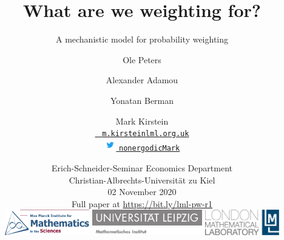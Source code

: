 \title[\insertlogo\\
\vspace{.5em}
\lmlblue{Mark Kirstein}]{\textbf{
What are we weighting for?
}}
\subtitle{A mechanistic model for probability weighting}


\author[M Kirstein]{
Ole Peters \and Alexander Adamou \and Yonatan Berman \and Mark Kirstein\\
\vspace{.5em}
{\small
\href{mailto:m.kirstein@lml.org.uk}{\Letter ~ \texttt{m.kirstein{\MVAt}lml.org.uk}} \\
\href{https://twitter.com/nonergodicMark}{\includegraphics[height=1.4em,valign=c]{img/Twitter_Logo_Blue} \MVAt \texttt{nonergodicMark}}}
}

\date[02 Nov 2020]{
Erich-Schneider-Seminar Economics Department\\
Christian-Albrechts-Universität zu Kiel\\
02 November 2020\\
\vspace{1em}
Full paper at \url{https://bit.ly/lml-pw-r1} \\
\vspace{1em}
\href{https://www.mis.mpg.de/jjost/research/economics.html}{\includegraphics[height=1.1cm]{img/MPIMIS_en.png}}
\hfill
\href{https://www.math.uni-leipzig.de/cms/de/forschung/abteilungen/wima/}{\includegraphics[height=1.1cm]{img/Uni_Leipzig_MathemInstitut.jpg}}
\hfill
\href{http://lml.org.uk}{
\includegraphics[height=1.1cm]{img/LML_LOGO_whiteBG.jpg}}
}
